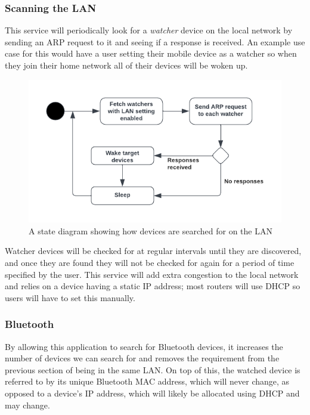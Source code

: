 \vspace{2mm}
\subsubsection{Scanning the LAN}

This service will periodically look for a \textit{watcher} device on the local network by sending an ARP request to it and seeing if a response is received. An example use case for this would have a user setting their mobile device as a watcher so when they join their home network all of their devices will be woken up.

\begin{figure}[H]
    \centering
    \includegraphics[width=\columnwidth]{assets/lan.png}
    \caption{A state diagram showing how devices are searched for on the LAN}
    \label{fig:my_label}
\end{figure}

Watcher devices will be checked for at regular intervals until they are discovered, and once they are found they will not be checked for again for a period of time specified by the user. This service will add extra congestion to the local network and relies on a device having a static IP address; most routers will use DHCP so users will have to set this manually. 

\vspace{2mm}
\subsubsection{Bluetooth}

 By allowing this application to search for Bluetooth devices, it increases the number of devices we can search for and removes the requirement from the previous section of being in the same LAN. On top of this, the watched device is referred to by its unique Bluetooth MAC address, which will never change, as opposed to a device's IP address, which will likely be allocated using DHCP and may change.


